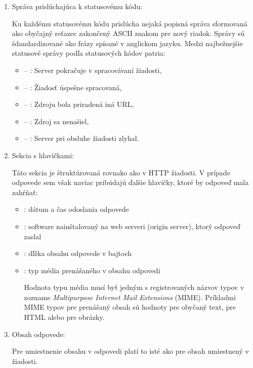 \begin{enumerate}
    \item Správa prislúchajúca k statusovému kódu:

    Ku každému statusovému kódu prislúcha nejaká popisná správa sformovaná ako obyčajný reťazec zakončený ASCII znakom pre nový riadok. Správy sú šdandardizované ako frázy spísané v anglickom jazyku.
    Medzi najbežnejšie statusové správy podľa statusových kódov patria:

    \begin{itemize}
        \item {} -- : Server pokračuje v spracovávaní žiadosti,
        \item {} -- : Žiadosť úspešne spracovaná,
        \item {} -- : Zdroju bola priradená iná URL,
        \item {} -- : Zdroj sa nenašiel,
        \item {} -- : Server pri obsluhe žiadosti zlyhal.
    \end{itemize}

    \pagebreak

    \item Sekcia s hlavičkami:

    Táto sekcia je štruktúrovaná rovnako ako v HTTP žiadosti. V prípade odpovede sem však naviac pribúdajú ďalšie hlavičky, ktoré by odpoveď mala zahŕňať: 

    \begin{itemize}
        \item {}: dátum a čas odoslania odpovede
        \item {}: software nainštalovaný na web serveri (origin server), ktorý odpoveď zaslal
        \item {}: dľžka obsahu odpovede v bajtoch
        \item {}: typ média prenášaného v obsahu odpovedi

        Hodnota typu média musí byť jedným s registrovaných názvov typov v zozname \textit{Multipurpose Internet Mail Extensions} (MIME). Príkladmi MIME typov pre prenášaný obsah sú hodnoty  pre obyčaný text,  pre HTML alebo  pre obrázky.
    \end{itemize}

    \item Obsah odpovede:

    Pre umiestnenie obsahu v odpovedi platí to isté ako pre obsah umiestnený v žiadosti.
\end{enumerate}


